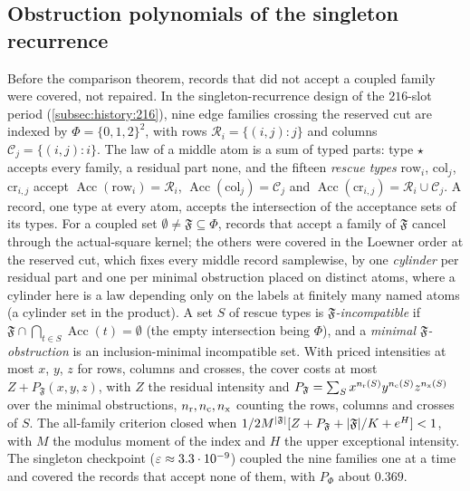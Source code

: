 \subsection{Obstruction polynomials of the singleton recurrence}
\label{subsec:obs:polynomials}

Before the comparison theorem, records that did not accept a coupled family
were covered, not repaired. In the singleton-recurrence design of the
$216$-slot period (\cref{subsec:history:216}), nine edge families crossing the reserved cut are
indexed by $\Phi=\{0,1,2\}^2$, with rows $\mathcal R_i=\{(i,j):j\}$ and columns
$\mathcal C_j=\{(i,j):i\}$. The law of a middle atom is a sum of typed parts:
type $\star$ accepts every family, a residual part none, and the fifteen
\emph{rescue types} $\mathrm{row}_i$, $\mathrm{col}_j$, $\mathrm{cr}_{i,j}$
accept $\operatorname{Acc}(\mathrm{row}_i)=\mathcal R_i$,
$\operatorname{Acc}(\mathrm{col}_j)=\mathcal C_j$ and
$\operatorname{Acc}(\mathrm{cr}_{i,j})=\mathcal R_i\cup\mathcal C_j$. A record,
one type at every atom, accepts the intersection of the acceptance sets of its
types. For a coupled set $\emptyset\ne\mathfrak F\subseteq\Phi$, records that
accept a family of $\mathfrak F$ cancel through the actual-square kernel; the
others were covered in the Loewner order at the reserved cut, which fixes every
middle record samplewise, by one \emph{cylinder} per residual
part and one per minimal obstruction placed on distinct atoms,
where a cylinder here is a law depending only on the labels at
finitely many named atoms (a cylinder set in the product). A set $S$ of rescue types is
\emph{$\mathfrak F$-incompatible} if
$\mathfrak F\cap\bigcap_{t\in S}\operatorname{Acc}(t)=\emptyset$ (the empty
intersection being $\Phi$), and a \emph{minimal $\mathfrak F$-obstruction} is an
inclusion-minimal incompatible set. With priced intensities at most $x$, $y$,
$z$ for rows, columns and crosses, the cover costs at most
$Z+P_{\mathfrak F}(x,y,z)$, with $Z$ the residual intensity and
$P_{\mathfrak F}=\sum_Sx^{n_{\rm r}(S)}y^{n_{\rm c}(S)}z^{n_{\rm x}(S)}$ over the
minimal obstructions, $n_{\rm r},n_{\rm c},n_{\rm x}$ counting the rows, columns
and crosses of $S$. The all-family criterion closed when
$1/2M^{|\mathfrak F|}[Z+P_{\mathfrak F}+|\mathfrak F|/K+e^H]<1$, with $M$
the modulus moment of the index and $H$ the upper exceptional intensity. The
singleton checkpoint ($\varepsilon\approx3.3\cdot10^{-9}$) coupled the nine families
one at a time and covered the records that accept none of them, with
$P_\Phi$ about $0.369$.

